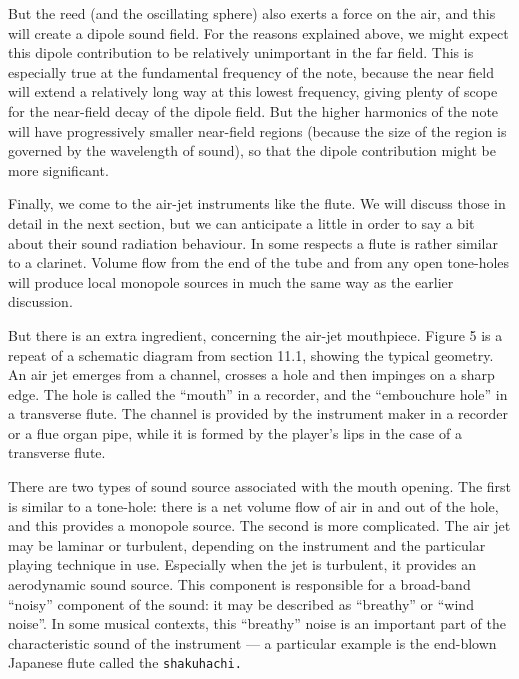   But the reed (and the oscillating sphere) also exerts a force on the air, and 
  this will create a dipole sound field. For the reasons explained above, we 
  might expect this dipole contribution to be relatively unimportant in the far 
  field. This is especially true at the fundamental frequency of the note, 
  because the near field will extend a relatively long way at this lowest 
  frequency, giving plenty of scope for the near-field decay of the dipole 
  field. But the higher harmonics of the note will have progressively smaller 
  near-field regions (because the size of the region is governed by the 
  wavelength of sound), so that the dipole contribution might be more 
  significant. 

  Finally, we come to the air-jet instruments like the flute. We will discuss 
  those in detail in the next section, but we can anticipate a little in order 
  to say a bit about their sound radiation behaviour. In some respects a flute 
  is rather similar to a clarinet. Volume flow from the end of the tube and 
  from any open tone-holes will produce local monopole sources in much the same 
  way as the earlier discussion. 

  But there is an extra ingredient, concerning the air-jet mouthpiece. Figure 5 
  is a repeat of a schematic diagram from section 11.1, showing the typical 
  geometry. An air jet emerges from a channel, crosses a hole and then impinges 
  on a sharp edge. The hole is called the “mouth” in a recorder, and the 
  “embouchure hole” in a transverse flute. The channel is provided by the 
  instrument maker in a recorder or a flue organ pipe, while it is formed by 
  the player’s lips in the case of a transverse flute. 


  There are two types of sound source associated with the mouth opening. The 
  first is similar to a tone-hole: there is a net volume flow of air in and out 
  of the hole, and this provides a monopole source. The second is more 
  complicated. The air jet may be laminar or turbulent, depending on the 
  instrument and the particular playing technique in use. Especially when the 
  jet is turbulent, it provides an aerodynamic sound source. This component is 
  responsible for a broad-band “noisy” component of the sound: it may be 
  described as “breathy” or “wind noise”. In some musical contexts, this 
  “breathy” noise is an important part of the characteristic sound of the 
  instrument — a particular example is the end-blown Japanese flute called the 
  \tt{}shakuhachi\rm{}. 

